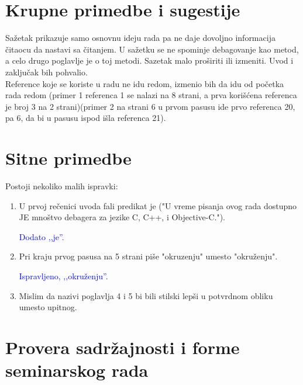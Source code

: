 \documentclass[a4paper]{report}
\newcommand{\odgovor}[1]{\textcolor{blue}{#1}}
\begin{document}
\section{Krupne primedbe i sugestije} 
\label{section:kpis}
Sažetak prikazuje samo osnovnu ideju rada pa ne daje dovoljno informacija čitaocu da nastavi sa čitanjem. U sažetku se ne spominje debagovanje kao metod, a celo drugo poglavlje je o toj metodi.  Sazetak malo proširiti ili izmeniti. Uvod i zaključak bih pohvalio. \\
Reference koje se koriste u radu ne idu redom, izmenio bih da idu od početka rada redom (primer 1 referenca 1 se nalazi na 8 strani, a prva korišćena referenca je broj 3 na 2 strani)(primer 2 na strani 6 u prvom pasusu ide prvo referenca 20, pa 6, da bi u pasusu ispod išla referenca 21).

\section{Sitne primedbe}
Postoji nekoliko malih ispravki:
\begin{enumerate}
\item  U prvoj rečenici uvoda fali predikat je ("U vreme pisanja ovog rada dostupno JE mnoštvo debagera za jezike C,
  C++, i Objective-C.").

  \odgovor{Dodato ,,je''.}
\item Pri kraju prvog pasusa na 5 strani piše "okruzenju" umesto "okruženju".

  \odgovor{Ispravljeno, ,,okruženju''.}
  
\item Mislim da nazivi poglavlja 4 i 5 bi bili stilski lepši u potvrdnom obliku umesto upitnog.  
\end{enumerate}

\section{Provera sadržajnosti i forme seminarskog rada}
\end{document}
